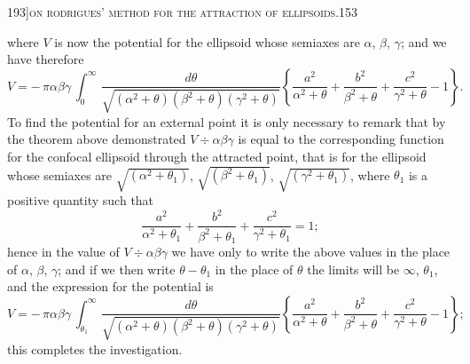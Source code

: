 \documentclass[11pt]{article}
\begin{document}
\newpage

\begin{center}
\small 193]\hfill\textsc{on rodrigues' method for the attraction of ellipsoids.}\hfill\textsc{153}
\end{center}

\medskip

\noindent where $V$ is now the potential for the ellipsoid whose semiaxes are $\alpha$, $\beta$, $\gamma$; and we have therefore
\[
V = -\,\pi\alpha\beta\gamma\,\int_{0}^{\infty}\,\frac{d\theta}{\sqrt{(\alpha^{2} + \theta)(\beta^{2} + \theta)(\gamma^{2} + \theta)}}\left\{\frac{a^{2}}{\alpha^{2} + \theta} + \frac{b^{2}}{\beta^{2} + \theta} + \frac{c^{2}}{\gamma^{2} + \theta} - 1\right\}.
\]
To find the potential for an external point it is only necessary to remark that by the theorem above demonstrated $V \div \alpha\beta\gamma$ is equal to the corresponding function for the confocal ellipsoid through the attracted point, that is for the ellipsoid whose semiaxes are $\sqrt{(\alpha^{2} + \theta_{1})}$, $\sqrt{(\beta^{2} + \theta_{1})}$, $\sqrt{(\gamma^{2} + \theta_{1})}$, where $\theta_{1}$ is a positive quantity such that
\[
\frac{a^{2}}{\alpha^{2} + \theta_{1}} + \frac{b^{2}}{\beta^{2} + \theta_{1}} + \frac{c^{2}}{\gamma^{2} + \theta_{1}} = 1;
\]
hence in the value of $V \div \alpha\beta\gamma$ we have only to write the above values in the place of $\alpha$, $\beta$, $\gamma$; and if we then write $\theta - \theta_{1}$ in the place of $\theta$ the limits will be $\infty$, $\theta_{1}$, and the expression for the potential is
\[
V = -\,\pi\alpha\beta\gamma\,\int_{\theta_{1}}^{\infty}\,\frac{d\theta}{\sqrt{(\alpha^{2} + \theta)(\beta^{2} + \theta)(\gamma^{2} + \theta)}}\left\{\frac{a^{2}}{\alpha^{2} + \theta} + \frac{b^{2}}{\beta^{2} + \theta} + \frac{c^{2}}{\gamma^{2} + \theta} - 1\right\};
\]
this completes the investigation.
\end{document}
